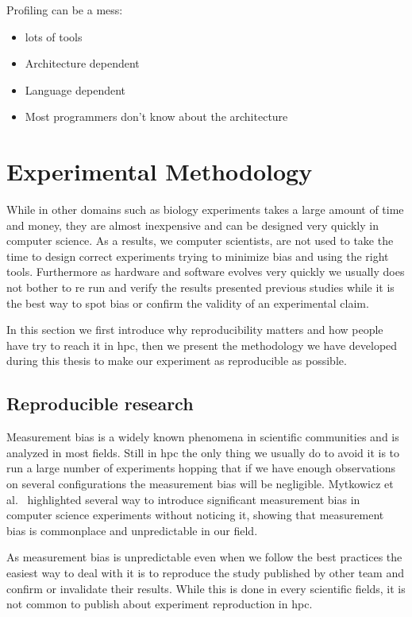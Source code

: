 Profiling can be a mess:
\begin{itemize}
    \item lots of tools
    \item Architecture dependent
    \item Language dependent
    \item Most programmers don't know about the architecture
\end{itemize}

\section{Experimental Methodology}
\label{sec:expe-methodo}

While in other domains such as biology experiments takes a large amount of
time and money, they are almost inexpensive and can be designed very quickly
in computer science. As a results, we computer scientists, are not used to
take the time to design correct experiments trying to minimize bias and using
the right tools. Furthermore as hardware and software evolves very quickly we
usually does not bother to re run and verify the results presented previous
studies while it is the best way to spot bias or confirm the validity of an
experimental claim.

In this section we first introduce why reproducibility matters and how people
have try to reach it in \gls{hpc}, then we present the methodology we have
developed during this thesis to make our experiment as reproducible as
possible.


\subsection{Reproducible research}

Measurement bias is a widely known phenomena in scientific communities and is
analyzed in most fields. Still in \gls{hpc} the only thing we usually do to avoid it
is to run a large number of experiments hopping that if we have enough
observations on several configurations the measurement bias will be
negligible. Mytkowicz et al.~\cite{Mytkowicz09Producing} highlighted several
way to introduce significant measurement bias in computer science experiments
without noticing it, showing that measurement bias is commonplace and
unpredictable in our field.

As measurement bias is unpredictable even when we follow the best practices
the easiest way to deal with it is to reproduce the study published by other
team and confirm or invalidate their results. While this is done in every
scientific fields, it is not common to publish about experiment reproduction
in \gls{hpc}.

